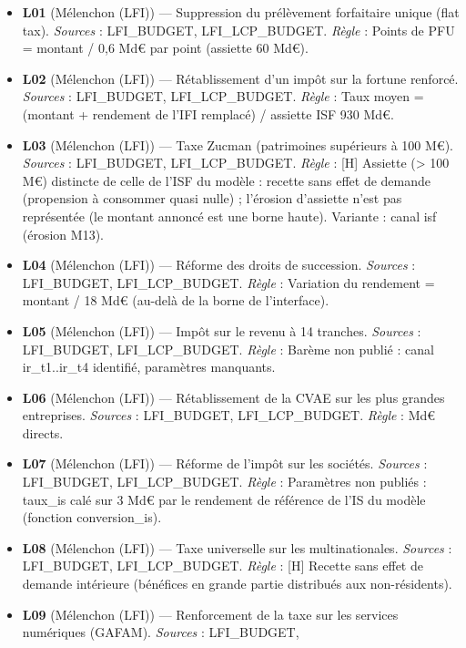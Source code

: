 \documentclass[
  11pt,
  11pt,
  a4paper,
  openany]{book}
\providecommand{\tightlist}{%
  \setlength{\itemsep}{0pt}\setlength{\parskip}{0pt}}
\begin{document}
\begin{itemize}
\tightlist
\item
  \textbf{L01} (Mélenchon (LFI)) --- Suppression du prélèvement
  forfaitaire unique (flat tax). \emph{Sources} : LFI\_BUDGET,
  LFI\_LCP\_BUDGET. \emph{Règle} : Points de PFU = montant / 0,6 Md€ par
  point (assiette 60 Md€).
\item
  \textbf{L02} (Mélenchon (LFI)) --- Rétablissement d'un impôt sur la
  fortune renforcé. \emph{Sources} : LFI\_BUDGET, LFI\_LCP\_BUDGET.
  \emph{Règle} : Taux moyen = (montant + rendement de l'IFI remplacé) /
  assiette ISF 930 Md€.
\item
  \textbf{L03} (Mélenchon (LFI)) --- Taxe Zucman (patrimoines supérieurs
  à 100 M€). \emph{Sources} : LFI\_BUDGET, LFI\_LCP\_BUDGET.
  \emph{Règle} : {[}H{]} Assiette (\textgreater{} 100 M€) distincte de
  celle de l'ISF du modèle : recette sans effet de demande (propension à
  consommer quasi nulle) ; l'érosion d'assiette n'est pas représentée
  (le montant annoncé est une borne haute). Variante : canal isf
  (érosion M13).
\item
  \textbf{L04} (Mélenchon (LFI)) --- Réforme des droits de succession.
  \emph{Sources} : LFI\_BUDGET, LFI\_LCP\_BUDGET. \emph{Règle} :
  Variation du rendement = montant / 18 Md€ (au-delà de la borne de
  l'interface).
\item
  \textbf{L05} (Mélenchon (LFI)) --- Impôt sur le revenu à 14 tranches.
  \emph{Sources} : LFI\_BUDGET, LFI\_LCP\_BUDGET. \emph{Règle} : Barème
  non publié : canal ir\_t1..ir\_t4 identifié, paramètres manquants.
\item
  \textbf{L06} (Mélenchon (LFI)) --- Rétablissement de la CVAE sur les
  plus grandes entreprises. \emph{Sources} : LFI\_BUDGET,
  LFI\_LCP\_BUDGET. \emph{Règle} : Md€ directs.
\item
  \textbf{L07} (Mélenchon (LFI)) --- Réforme de l'impôt sur les
  sociétés. \emph{Sources} : LFI\_BUDGET, LFI\_LCP\_BUDGET. \emph{Règle}
  : Paramètres non publiés : taux\_is calé sur 3 Md€ par le rendement de
  référence de l'IS du modèle (fonction conversion\_is).
\item
  \textbf{L08} (Mélenchon (LFI)) --- Taxe universelle sur les
  multinationales. \emph{Sources} : LFI\_BUDGET, LFI\_LCP\_BUDGET.
  \emph{Règle} : {[}H{]} Recette sans effet de demande intérieure
  (bénéfices en grande partie distribués aux non-résidents).
\item
  \textbf{L09} (Mélenchon (LFI)) --- Renforcement de la taxe sur les
  services numériques (GAFAM). \emph{Sources} : LFI\_BUDGET,

\end{itemize}
\end{document}
